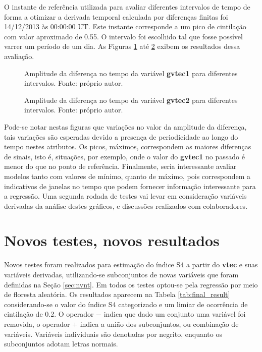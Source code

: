 O instante de referência utilizada para avaliar diferentes intervalos de tempo de forma a otimizar a derivada temporal calculada por diferenças finitas foi 14/12/2013 às 00:00:00 UT. Este instante corresponde a um pico de cintilação com valor aproximado de 0.55. O intervalo foi escolhido tal que fosse possível varrer um período de um dia. As Figuras \ref{fig:findifgvtec1} até \ref{fig:findifgvtec2} exibem os resultados dessa avaliação.

\begin{figure}[H]
\centering
{}
\caption{Amplitude da diferença no tempo da variável {\bf gvtec1} para diferentes intervalos. Fonte: próprio autor.}
\label{fig:findifgvtec1}
\end{figure}

\begin{figure}[H]
\centering
{}
\caption{Amplitude da diferença no tempo da variável {\bf gvtec2} para diferentes intervalos. Fonte: próprio autor.}
\label{fig:findifgvtec2}
\end{figure}

Pode-se notar nestas figuras que variações no valor da amplitude da diferença, tais variações são esperadas devido a presença de periodicidade ao longo do tempo nestes atributos. Os picos, máximos, correspondem as maiores diferenças de sinais, isto é, situações, por exemplo, onde o valor do {\bf gvtec1} no passado é menor do que no ponto de referência. Finalmente, seria interessante avaliar modelos tanto com valores de mínimo, quanto de máximo, pois correspondem a indicativos de janelas no tempo que podem fornecer informação interessante para a regressão. Uma segunda rodada de testes vai levar em consideração variáveis derivadas da análise destes gráficos, e discussões realizados com colaboradores.

\section{Novos testes, novos resultados}

Novos testes foram realizados para estimação do índice S4 a partir do {\bf vtec} e suas variáveis derivadas, utilizando-se subconjuntos de novas variáveis que foram definidas na Seção \ref{sec:nvnt}. Em todos os testes optou-se pela regressão por meio de floresta aleatória. Os resultados aparecem na Tabela \ref{tab:final_result} considerando-se o valor do índice S4 categorizado e um limiar de ocorrência de cintilação de 0.2. O operador $-$ indica que dado um conjunto uma variável foi removida, o operador $+$ indica a união dos subconjuntos, ou combinação de variáveis. Variáveis individuais são denotadas por negrito, enquanto os subconjuntos adotam letras normais.

